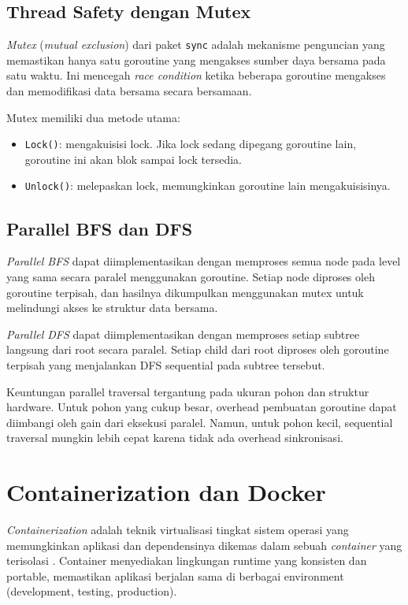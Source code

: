 \subsection{Thread Safety dengan Mutex}

\textit{Mutex} (\textit{mutual exclusion}) dari paket \texttt{sync} adalah
mekanisme penguncian yang memastikan hanya satu goroutine yang mengakses
sumber daya bersama pada satu waktu. Ini mencegah \textit{race condition}
ketika beberapa goroutine mengakses dan memodifikasi data bersama secara
bersamaan.

Mutex memiliki dua metode utama:
\begin{itemize}
    \item \texttt{Lock()}: mengakuisisi lock. Jika lock sedang dipegang goroutine
    lain, goroutine ini akan blok sampai lock tersedia.
    \item \texttt{Unlock()}: melepaskan lock, memungkinkan goroutine lain
    mengakuisisinya.
\end{itemize}

\subsection{Parallel BFS dan DFS}

\textit{Parallel BFS} dapat diimplementasikan dengan memproses semua node pada
level yang sama secara paralel menggunakan goroutine. Setiap node diproses
oleh goroutine terpisah, dan hasilnya dikumpulkan menggunakan mutex untuk
melindungi akses ke struktur data bersama.

\textit{Parallel DFS} dapat diimplementasikan dengan memproses setiap subtree
langsung dari root secara paralel. Setiap child dari root diproses oleh
goroutine terpisah yang menjalankan DFS sequential pada subtree tersebut.

Keuntungan parallel traversal tergantung pada ukuran pohon dan struktur hardware.
Untuk pohon yang cukup besar, overhead pembuatan goroutine dapat diimbangi oleh
gain dari eksekusi paralel. Namun, untuk pohon kecil, sequential traversal
mungkin lebih cepat karena tidak ada overhead sinkronisasi.

\section{Containerization dan Docker}

\textit{Containerization} adalah teknik virtualisasi tingkat sistem operasi yang
memungkinkan aplikasi dan dependensinya dikemas dalam sebuah \textit{container}
yang terisolasi \cite{docker_docs}. Container menyediakan lingkungan runtime
yang konsisten dan portable, memastikan aplikasi berjalan sama di berbagai
environment (development, testing, production).

